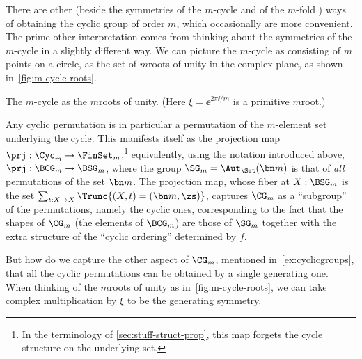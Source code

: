 \begin{example}
\label{ex:Cm}
There are other (beside the symmetries of the $m$-cycle and of the $m$-fold \covering) ways of obtaining the cyclic group of order $m$, which occasionally are more convenient.
The prime other interpretation comes from thinking about the symmetries of the $m$-cycle in a slightly different way.
We can picture the $m$-cycle as consisting of $m$ points on a circle,
\eg as the set of $m$\th roots of unity in the complex plane, as shown in~\cref{fig:m-cycle-roots}.
\begin{marginfigure}
  \caption{The $m$-cycle as the $m$\th roots of unity.
    (Here $\xi=\ee^{2\pi\ii/m}$ is a primitive $m$\th root.)}
  \label{fig:m-cycle-roots}
\end{marginfigure}
Any cyclic permutation is in particular a permutation of the $m$-element set underlying the cycle.
This manifests itself as the projection map $\prj : \Cyc_m \to \FinSet_m$,\footnote{%
  In the terminology of \cref{sec:stuff-struct-prop},
  this map forgets the cycle structure on the underlying set.}
equivalently, using the notation introduced above, $\prj : \BCG_m \to \BSG_m$,
where the group $\SG_m=\Aut_\Set(\bn m)$ is that of
\emph{all} permutations of the set $\bn m$.
The projection map,
whose fiber at $X : \BSG_m$ is the set $\sum_{t:X\to X}\Trunc{(X,t)=(\bn m,\zs)}$,
captures $\CG_m$ as a ``subgroup'' of the permutations, namely the cyclic ones,
corresponding to the fact that the shapes of $\CG_m$ (\ie the elements of $\BCG_m$)
are those of $\SG_m$
together with the extra structure of the ``cyclic ordering'' determined by $f$.

But how do we capture the other aspect of $\CG_m$,
mentioned in~\cref{ex:cyclicgroups},
that all the cyclic permutations can be obtained by a single generating one.
When thinking of the $m$\th roots of unity as in~\cref{fig:m-cycle-roots},
we can take complex multiplication by $\xi$ to be the generating symmetry.


\end{example}
